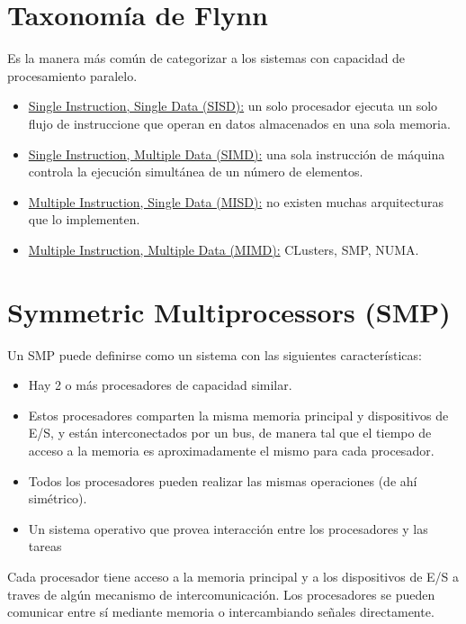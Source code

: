 \newpage

\section{Taxonom\'ia de Flynn}

Es la manera m\'as com\'un de categorizar a los sistemas con capacidad de procesamiento paralelo.

\begin{itemize}
 \item \underline{Single Instruction, Single Data (SISD):} un solo procesador ejecuta un solo flujo de instruccione que operan en datos almacenados en una sola memoria.
 \item \underline{Single Instruction, Multiple Data (SIMD):} una sola instrucci\'on de m\'aquina controla la ejecuci\'on simult\'anea de un n\'umero de elementos.
 \item \underline{Multiple Instruction, Single Data (MISD):} no existen muchas arquitecturas que lo implementen.
 \item \underline{Multiple Instruction, Multiple Data (MIMD):} CLusters, SMP, NUMA.
\end{itemize}

\newpage

\section{Symmetric Multiprocessors (SMP)}

Un SMP puede definirse como un sistema con las siguientes caracter\'isticas:

\begin{itemize}
 \item Hay 2 o m\'as procesadores de capacidad similar.
 \item Estos procesadores comparten la misma memoria principal y dispositivos de E/S, y est\'an interconectados por un bus, de manera tal que
 el tiempo de acceso a la memoria es aproximadamente el mismo para cada procesador.
 \item Todos los procesadores pueden realizar las mismas operaciones (de ah\'i sim\'etrico).
 \item Un sistema operativo que provea interacci\'on entre los procesadores y las tareas
\end{itemize}

Cada procesador tiene acceso a la memoria principal y a los dispositivos de E/S a traves de alg\'un mecanismo de intercomunicaci\'on. Los procesadores
se pueden comunicar entre s\'i mediante memoria o intercambiando se\~nales directamente.

